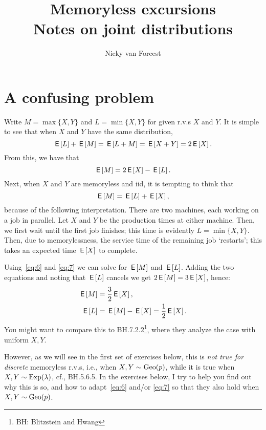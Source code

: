 \documentclass[a4paper,11pt]{article}
\title{Memoryless excursions\\
Notes on joint distributions }
\author{Nicky van Foreest}
\begin{document}
\maketitle
\tableofcontents



\section{A confusing problem}
\label{sec:confusing-problem}

Write $M=\max\{X,Y\}$ and $L=\min\{X,Y\}$ for given r.v.s $X$ and $Y$.
It is simple to see that when $X$ and $Y$  have the same distribution,
\begin{equation}
\,\mathsf{E}\left[L\right] + \,\mathsf{E}\left[M\right] = \,\mathsf{E}\left[L+M\right]=\,\mathsf{E}\left[X+Y\right] = 2\,\mathsf{E}\left[X\right].
\end{equation}
From this, we have that
\begin{equation}
  \label{eq:6}
\,\mathsf{E}\left[M\right] = 2\,\mathsf{E}\left[X\right] - \,\mathsf{E}\left[L\right].
\end{equation}
Next, when $X$ and $Y$ are memoryless and iid, it is  tempting to think that
\begin{equation}
  \label{eq:7}
\,\mathsf{E}\left[M\right] = \,\mathsf{E}\left[L\right]  + \,\mathsf{E}\left[X\right],
\end{equation}
because of  the following interpretation.
There are two machines, each working on a job in parallel.
Let $X$ and $Y$ be the production times at either machine.
Then, we first wait until the first job finishes; this time is evidently $L=\min\{X, Y\}$.
Then, due to memorylessness, the service time of the remaining job `restarts'; this takes an expected time $\,\mathsf{E}\left[X\right]$ to complete.

Using~\cref{eq:6} and \cref{eq:7}  we can solve for $\,\mathsf{E}\left[M\right]$ and $\,\mathsf{E}\left[L\right]$.
Adding the two equations and noting that $\,\mathsf{E}\left[L\right]$ cancels we get $2\,\mathsf{E}\left[M\right] = 3 \,\mathsf{E}\left[X\right] $, hence:
\begin{align}
\,\mathsf{E}\left[M\right] &= \frac 3 2 \,\mathsf{E}\left[X\right],\label{eq:35}\\
\,\mathsf{E}\left[L\right] &= \,\mathsf{E}\left[M\right] - \,\mathsf{E}\left[X\right] = \frac 1 2 \,\mathsf{E}\left[X\right].\label{eq:36}
\end{align}
You might want to compare this to BH.7.2.2\footnote{BH: Blitzstein and Hwang}, where they analyze the case with uniform $X, Y$.

However, as we will see in the first set of exercises below, this is \emph{ not true for discrete} memoryless r.v.s, i.e., when $X, Y \sim \mathrm{Geo}(p)$, while it is true when $X, Y \sim \mathrm{Exp}(\lambda)$, cf., BH.5.6.5.
In the exercises below, I try to help you find out why this is so, and how to adapt~\cref{eq:6} and/or \cref{eq:7} so that they also hold when $X,Y\sim\mathrm{Geo}(p)$.
\end{document}
